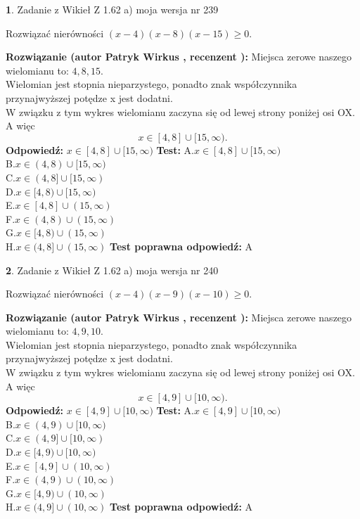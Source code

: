\documentclass[12pt, a4paper]{article}
\theoremstyle{definition} %
\newtheorem{zad}{}
\newcommand{\zadStart}[1]{\begin{zad}#1\newline}
\newcommand{\zadStop}{\end{zad}}
\newcommand{\rozwStart}[2]{\noindent \textbf{Rozwiązanie (autor #1 , recenzent #2): }\newline}
\newcommand{\rozwStop}{\newline}
\newcommand{\odpStart}{\noindent \textbf{Odpowiedź:}\newline}
\newcommand{\odpStop}{\newline}
\newcommand{\testStart}{\noindent \textbf{Test:}\newline}
\newcommand{\testStop}{\newline}
\newcommand{\kluczStart}{\noindent \textbf{Test poprawna odpowiedź:}\newline}
\newcommand{\kluczStop}{\newline}
\begin{document}
\zadStart{Zadanie z Wikieł Z 1.62 a) moja wersja nr 239}

Rozwiązać nierówności $(x-4)(x-8)(x-15)\ge0$.
\zadStop
\rozwStart{Patryk Wirkus}{}
Miejsca zerowe naszego wielomianu to: $4, 8, 15$.\\
Wielomian jest stopnia nieparzystego, ponadto znak współczynnika przy\linebreak najwyższej potędze x jest dodatni.\\ W związku z tym wykres wielomianu zaczyna się od lewej strony poniżej osi OX. A więc $$x \in [4,8] \cup [15,\infty).$$
\rozwStop
\odpStart
$x \in [4,8] \cup [15,\infty)$
\odpStop
\testStart
A.$x \in [4,8] \cup [15,\infty)$\\
B.$x \in (4,8) \cup [15,\infty)$\\
C.$x \in (4,8] \cup [15,\infty)$\\
D.$x \in [4,8) \cup [15,\infty)$\\
E.$x \in [4,8] \cup (15,\infty)$\\
F.$x \in (4,8) \cup (15,\infty)$\\
G.$x \in [4,8) \cup (15,\infty)$\\
H.$x \in (4,8] \cup (15,\infty)$
\testStop
\kluczStart
A
\kluczStop



\zadStart{Zadanie z Wikieł Z 1.62 a) moja wersja nr 240}

Rozwiązać nierówności $(x-4)(x-9)(x-10)\ge0$.
\zadStop
\rozwStart{Patryk Wirkus}{}
Miejsca zerowe naszego wielomianu to: $4, 9, 10$.\\
Wielomian jest stopnia nieparzystego, ponadto znak współczynnika przy\linebreak najwyższej potędze x jest dodatni.\\ W związku z tym wykres wielomianu zaczyna się od lewej strony poniżej osi OX. A więc $$x \in [4,9] \cup [10,\infty).$$
\rozwStop
\odpStart
$x \in [4,9] \cup [10,\infty)$
\odpStop
\testStart
A.$x \in [4,9] \cup [10,\infty)$\\
B.$x \in (4,9) \cup [10,\infty)$\\
C.$x \in (4,9] \cup [10,\infty)$\\
D.$x \in [4,9) \cup [10,\infty)$\\
E.$x \in [4,9] \cup (10,\infty)$\\
F.$x \in (4,9) \cup (10,\infty)$\\
G.$x \in [4,9) \cup (10,\infty)$\\
H.$x \in (4,9] \cup (10,\infty)$
\testStop
\kluczStart
A
\kluczStop
\end{document}
